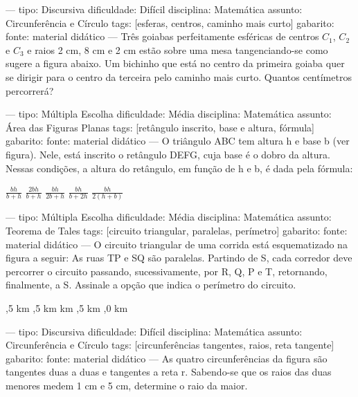 ---
tipo: Discursiva
dificuldade: Difícil
disciplina: Matemática
assunto: Circunferência e Círculo
tags: [esferas, centros, caminho mais curto]
gabarito:
fonte: material didático
---
\question
Três goiabas perfeitamente esféricas de centros $C_1$, $C_2$ e $C_3$ e raios 2 cm, 8 cm e 2 cm estão sobre uma mesa tangenciando-se como sugere a figura abaixo.
Um bichinho que está no centro da primeira goiaba quer se dirigir para o centro da terceira pelo caminho mais curto. Quantos centímetros percorrerá?


---
tipo: Múltipla Escolha
dificuldade: Média
disciplina: Matemática
assunto: Área das Figuras Planas
tags: [retângulo inscrito, base e altura, fórmula]
gabarito:
fonte: material didático
---
\question
O triângulo ABC tem altura h e base b (ver figura). Nele, está inscrito o retângulo DEFG, cuja base é o dobro da altura. Nessas condições, a altura do retângulo, em função de h e b, é dada pela fórmula:
\begin{choices}
\choice $\frac{bh}{b+h}$
\choice $\frac{2bh}{b+h}$
\choice $\frac{bh}{2b+h}$
\choice $\frac{bh}{b+2h}$
\choice $\frac{bh}{2(h+b)}$
\end{choices}


---
tipo: Múltipla Escolha
dificuldade: Média
disciplina: Matemática
assunto: Teorema de Tales
tags: [circuito triangular, paralelas, perímetro]
gabarito:
fonte: material didático
---
\question
O circuito triangular de uma corrida está esquematizado na figura a seguir:
As ruas TP e SQ são paralelas. Partindo de S, cada corredor deve percorrer o circuito passando, sucessivamente, por R, Q, P e T, retornando, finalmente, a S.
Assinale a opção que indica o perímetro do circuito.
\begin{choices}
,5 km
,5 km
 km
,5 km
,0 km
\end{choices}


---
tipo: Discursiva
dificuldade: Difícil
disciplina: Matemática
assunto: Circunferência e Círculo
tags: [circunferências tangentes, raios, reta tangente]
gabarito:
fonte: material didático
---
\question
As quatro circunferências da figura são tangentes duas a duas e tangentes a reta r. Sabendo-se que os raios das duas menores medem 1 cm e 5 cm, determine o raio da maior.


